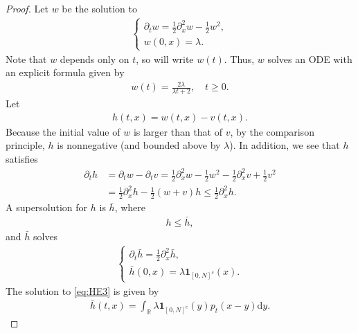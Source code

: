 \documentclass[12pt, reqno]{amsart}
\newcommand{\R}{{\mathbb{R}}}
\renewcommand{\d}{\mathrm{d}}
\newcommand{\<}{\langle}
\renewcommand{\>}{\rangle}
\begin{document}
\begin{proof}
Let $w$ be the solution to 
\begin{align}\label{eq:HE2}
\begin{cases}
\partial_tw= \frac12 \partial_x^2 w -\frac12 w^2,\\
w(0, x)= \lambda.
\end{cases}
\end{align}
Note that $w$ depends only on $t$, so will write $w(t)$. Thus, $w$ solves an ODE with an explicit formula given by
\begin{align*}
w(t)= \frac{2\lambda}{\lambda t+2}, \quad t\geq0.
\end{align*}
Let 
\begin{align*}
h(t,x)= w(t,x)-v(t,x).
\end{align*}
Because the initial value of $w$ is larger than that of $v$, by the comparison principle, $h$ is nonnegative (and bounded above by $\lambda$). In addition,  we see that $h$ satisfies
\begin{align*}
\partial_t h &=\partial_t w-\partial_t v
=\frac12\partial_x^2 w-\frac12w^2-\frac12\partial_x^2v+\frac12v^2\\
&=\frac12\partial_x^2h-\frac12(w+v)h \leq \frac12\partial_x^2h.
\end{align*}
A supersolution for $h$ is $\bar{h}$, where
\begin{align}\label{eq:h}
h\leq \bar{h},
\end{align}
and $\bar{h}$ solves
\begin{align}\label{eq:HE3}
\begin{cases}
\partial_t \bar{h}=\frac12\partial_x^2\bar{h},\\
\bar{h}(0, x)= \lambda \bm{1}_{[0, N]^c}(x).
\end{cases}
\end{align}
The solution to \eqref{eq:HE3} is given by
\begin{align*}
\bar{h}(t,x)= \int_\R \lambda \bm{1}_{[0, N]^c}(y)p_t(x-y)\d y.
\end{align*}



\end{proof}
\end{document}
